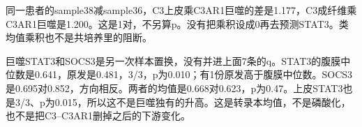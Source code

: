 同一患者的sample38减sample36，C3上皮乘C3AR1巨噬的差是1.177，C3成纤维乘C3AR1巨噬是1.200。这是1对，不另算p。没有把乘积设成0再去预测STAT3。类均值乘积也不是共培养里的阻断。

巨噬STAT3和SOCS3是另一次样本置换，没有并进上面7条的q。STAT3的腹膜中位数是0.641，原发是0.481，3/3，p为0.010；有1份原发高于腹膜中位数。SOCS3是0.695对0.852，方向相反。两者的均值是0.668对0.623，p为0.47。上皮STAT3也是3/3、p为0.015，所以这不是巨噬独有的升高。这是转录本均值，不是磷酸化，也不是把C3--C3AR1删掉之后的下游变化。
